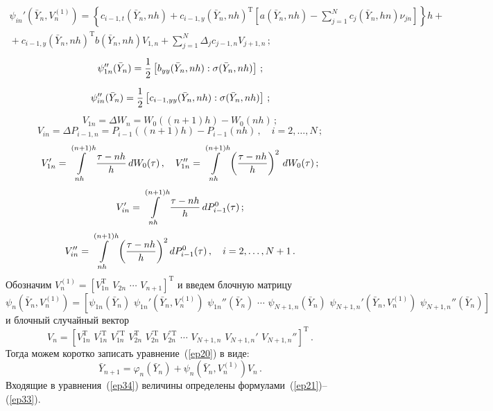 {    \vspace*{-12pt}
    
    \noindent
    \begin{multline}
    \psi_{in}'(\bar Y_n,V_n^{(1)})=\left\{c_{i-1,t}(\bar
    Y_n,nh)+c_{i-1,y}(\bar Y_n,nh)^{\mathrm{T}} \left[a(\bar Y_n,nh)-\sum\limits_{j=1}^N c_j(\bar Y_n,hn)\nu_{jn}
    \right]\right\}h+{}\\
    {}+c_{i-1,y}(\bar Y_n,nh)^{\mathrm{T}} b(\bar Y_n,nh)V_{1,n}+\sum\limits_{j=1}^N
    \Delta_j c_{j-1,n}V_{j+1,n}\,;\label{ep25}
    \end{multline}
\begin{equation}
\psi_{1n}''(\bar Y_n)=\displaystyle\frac{\displaystyle 1\mathstrut}{\displaystyle 2\mathstrut}\left[b_{yy}(\bar Y_n,nh):
    \sigma(\bar Y_n,nh)\right]\,;\label{ep26}
    \end{equation}
\begin{equation}
\psi_{in}''(\bar Y_n)=\displaystyle\frac{\displaystyle 1\mathstrut}{\displaystyle 2\mathstrut}\left[c_{i-1,yy}(\bar Y_n,nh):
    \sigma(\bar Y_n,nh)\right]\,;\label{ep27}
    \end{equation}
\begin{equation}
V_{1n}=\Delta W_n=W_0((n+1)h)-W_0(nh)\,;\label{ep28}
\end{equation}
    \begin{equation}
    V_{in}=\Delta P_{i-1,n}=P_{i-1}((n+1)h)-P_{i-1}(nh)\,,
    \quad i=2,\ldots,N\,; \label{ep29}
    \end{equation}
\begin{equation}
V_{1n}'=\int\limits_{nh}^{(n+1)h} {\displaystyle\frac{\displaystyle \tau-nh\mathstrut}{\displaystyle h\mathstrut}} \,dW_0(\tau)\,,\quad V_{1n}''=
    \int\limits_{nh}^{(n+1)h} \left({\displaystyle\frac{\displaystyle \tau-nh\mathstrut}{\displaystyle h\mathstrut}}\right)^2 \,dW_0(\tau)\,;\label{ep30}
    \end{equation}
\begin{equation}
V_{in}'=\int\limits_{nh}^{(n+1)h} {\displaystyle\frac{\displaystyle \tau-nh\mathstrut}{\displaystyle h\mathstrut}} \,dP_{i-1}^0(\tau)\,;\label{ep31}
\end{equation}
\begin{equation}
V_{in}''=\int\limits_{nh}^{(n+1)h} \left({\displaystyle\frac{\displaystyle \tau-nh\mathstrut}{\displaystyle h\mathstrut}}\right)^2 dP_{i-1}^0(\tau)\,,
    \quad i=2,\ldots,N+1\,.\label{ep32}
    \end{equation}
Обозначим
$V_n^{(1)}=\left[V_{1n}^{\mathrm{T}}\,\, V_{2n}\,\,\cdots\,\, V_{n+1}\right]^{\mathrm{T}}$
и введем блочную матрицу
    $$\psi_n(\bar Y_n,V_n^{(1)})=\left[\psi_{1n}(\bar Y_n)\,\,
    \psi_{1n}'(\bar Y_n,V_n^{(1)})\,\, \psi_{1n}''(\bar Y_n)\,\,\cdots\,\,
    \psi_{N+1,n}(\bar Y_n)\,\, \psi_{N+1,n}'(\bar Y_n,V_n^{(1)})\,\,
    \psi_{N+1,n}''(\bar Y_n) \right]$$
и блочный случайный вектор
    \begin{equation}
    V_n=\left[V_{1n}^{\mathrm{T}}\,\, V_{1n}^{'\mathrm{T}}\,\, V_{1n}^{''\mathrm{T}}\,\,
    V_{2n}^{\mathrm{T}}\,\, V_{2n}^{'\mathrm{T}}\,\, V_{2n}^{''\mathrm{T}}\,\,
    \cdots\,\,V_{N+1,n}\,\, V_{N+1,n}'\,\, V_{N+1,n}'' \right]^{\mathrm{T}}\,.\label{ep33}
    \end{equation}
Тогда можем коротко записать уравнение~(\ref{ep20}) в виде:
\begin{equation}
\bar Y_{n+1}=\varphi_n(\bar Y_n)+\psi_n(\bar
    Y_n,V_n^{(1)})V_n\,.\label{ep34}
    \end{equation}
Входящие в уравнения~(\ref{ep34}) величины определены формулами~(\ref{ep21})--(\ref{ep33}).

}
